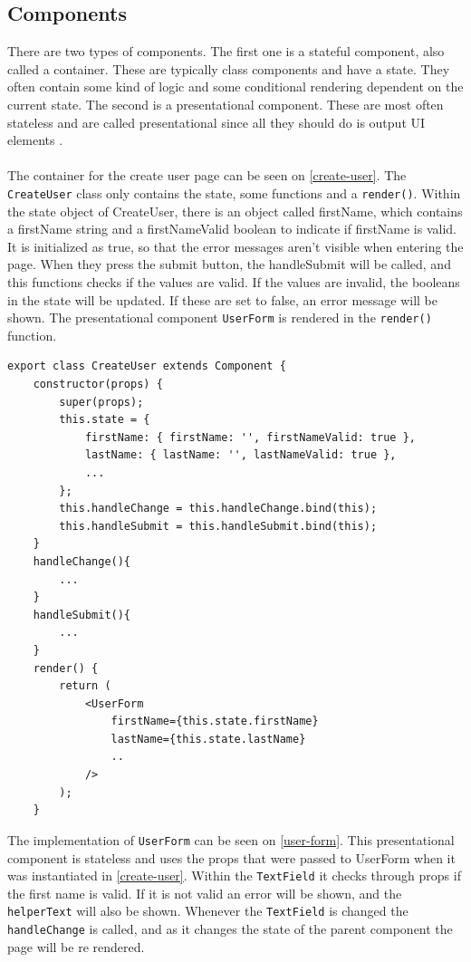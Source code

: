 \subsection{Components}
There are two types of components. 
The first one is a stateful component, also called a container.
These are typically class components and have a state.
They often contain some kind of logic and some conditional rendering dependent on the current state.
The second is a presentational component.
These are most often stateless and are called presentational since all they should do is output UI elements \cite{Vumbula-react}.
\\\\
The container for the create user page can be seen on \autoref{create-user}.
The \texttt{CreateUser} class only contains the state, some functions and a \texttt{render()}.
Within the state object of CreateUser, there is an object called firstName, which contains a firstName string and a firstNameValid boolean to indicate if firstName is valid.
It is initialized as true, so that the error messages aren't visible when entering the page.
When they press the submit button, the handleSubmit will be called, and this functions checks if the values are valid.
If the values are invalid, the booleans in the state will be updated. 
If these are set to false, an error message will be shown.
The presentational component \texttt{UserForm} is rendered in the \texttt{render()} function. 
\begin{lstlisting}[caption={Component to create user}, captionpos=b, label={create-user}]
export class CreateUser extends Component {
    constructor(props) {
        super(props);
        this.state = {
            firstName: { firstName: '', firstNameValid: true },
            lastName: { lastName: '', lastNameValid: true },
            ...
        };
        this.handleChange = this.handleChange.bind(this);
        this.handleSubmit = this.handleSubmit.bind(this);
    }
    handleChange(){
        ...
    }
    handleSubmit(){
        ...
    }
    render() {
        return (
            <UserForm
                firstName={this.state.firstName}
                lastName={this.state.lastName}
                ..
            />
        );
    }
\end{lstlisting}

The implementation of \texttt{UserForm} can be seen on \autoref{user-form}.
This presentational component is stateless and uses the props that were passed to UserForm when it was instantiated in \autoref{create-user}.
Within the \texttt{TextField} it checks through props if the first name is valid. 
If it is not valid an error will be shown, and the \texttt{helperText} will also be shown.
Whenever the \texttt{TextField} is changed the \texttt{handleChange} is called, and as it changes the state of the parent component the page will be re rendered.

